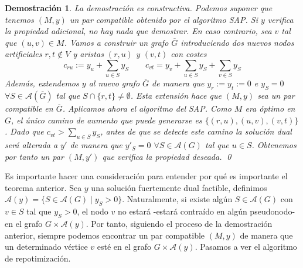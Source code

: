 \documentclass[twoside,a4paper,openright,12pt]{book}
\newtheorem*{dem}{Demostración}
\begin{document}
\begin{dem}
La demostración es constructiva. Podemos suponer que tenemos $(M,y)$ un par compatible obtenido por el algoritmo SAP. Si $y$ verifica la propiedad adicional, no hay nada que demostrar. En caso contrario, sea $v$ tal que $(u,v)\in M$. Vamos a construir un grafo $\overline{G}$ introduciendo dos nuevos nodos artificiales $r,t\notin V$ y aristas $(r,u)$ y $(v,t)$ con costes 
$$
c_{ru}:= y_u+\sum_{u\in S}y_S \qquad c_{vt} = y_v + \sum_{u\in S}y_S  +\sum_{v\in S}y_S 
$$
Además, extendemos $y$ al nuevo grafo $\overline{G}$ de manera que $y_r:=y_t:=0$ e $y_S = 0$ $\forall S \in \mathcal{A}(\overline{G})$ tal que $S\cap\{r,t\}\neq \emptyset$. Esta extensión hace que $(M,y)$ sea un par compatible en $\overline{G}$. Aplicamos ahora el algoritmo del SAP. Como $M$ era óptimo en $G$, el único camino de aumento que puede generarse es $\{(r,u),(u,v),(v,t)\}$. Dado que $c_{vt}>\sum_{u\in S}y_S$, antes de que se detecte este camino la solución dual será alterada a $y'$ de manera que $y'_S = 0$ $\forall S \in \mathcal{A}(G)$ tal que $u \in S$. Obtenemos por tanto un par $(M,y')$ que verifica la propiedad deseada. \qed
\end{dem}
Es importante hacer una consideración para entender por qué es importante el teorema anterior. Sea $y$ una solución fuertemente dual factible, definimos $\mathcal{A}(y)=\{S\in \mathcal{A}(G)\mid y_S>0\}$. Naturalmente, si existe algún $S \in \mathcal{A}(G)$ con $v\in S$ tal que $y_S >0$, el nodo $v$ no estará -estará contraído en algún pseudonodo- en el grafo $G\times \mathcal{A}(y)$. Por tanto, siguiendo el proceso de la demostración anterior, siempre podemos encontrar un par compatible $(M,y)$ de manera que un determinado vértice $v$ esté en el grafo $G\times \mathcal{A}(y)$. Pasamos a ver el algoritmo de repotimización. 
\end{document}
